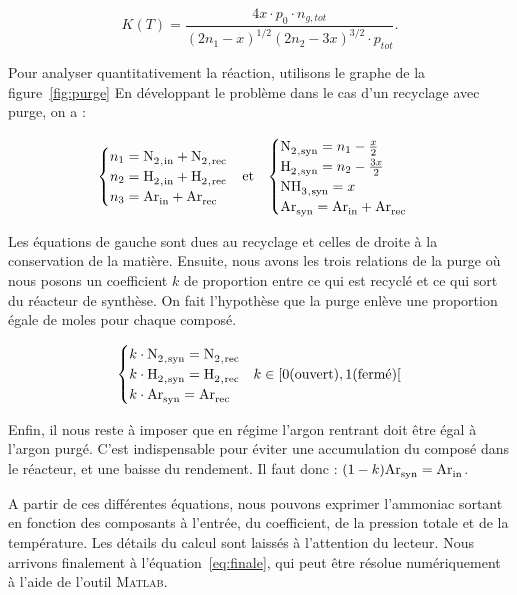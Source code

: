 $$K(T) = \frac{4x\cdot p_0\cdot n_{g,tot}}{(2n_1 - x)^{1/2} (2n_2 - 3x)^{3/2} \cdot p_{tot}}.$$

Pour analyser quantitativement la réaction, utilisons le graphe de la figure~\ref{fig:purge}
En développant le problème dans le cas d'un recyclage avec purge, on a :

\begin{align}
	\notag
	\begin{cases}
	 n_1 = \ce{N2_{,in} + N2_{,rec}} \\
	 n_2 = \ce{H2_{,in} + H2_{,rec}} \\
	 n_3 = \ce{Ar_{in} + Ar_{rec}} \\
	\end{cases}
	 &  \text{et}  &
	\begin{cases}
	 \ce{N2_{,syn}} = n_1 - \frac{x}{2} \\
	 \ce{H2_{,syn}} = n_2 - \frac{3x}{2} \\
	 \ce{NH3_{,syn}} = x \\
	 \ce{Ar_{syn} = Ar_{in} + Ar_{rec}} \\ 
	\end{cases}
	\\
\end{align}

Les équations de gauche sont dues au recyclage et celles de droite 
à la conservation de la matière. Ensuite, nous avons les trois relations
de la purge où nous posons un coefficient $k$ de proportion entre ce qui
est recyclé et ce qui sort du réacteur de synthèse. On fait l'hypothèse
que la purge enlève une proportion égale de moles pour chaque composé.

$$
\begin{cases}
 k\cdot \ce{N2_{,syn}} = \ce{N2_{,rec}} \\ 
 k\cdot \ce{H2_{,syn}} = \ce{H2_{,rec}} & k \in [0 \text{(ouvert)}, 1 \text{(fermé)}[ \\
 k\cdot \ce{Ar_{syn}} = \ce{Ar_{rec}} \\
\end{cases}
$$

Enfin, il nous reste à imposer que en régime l'argon rentrant doit être égal
à l'argon purgé. C'est indispensable pour éviter une accumulation du composé
dans le réacteur, et une baisse du rendement. 
Il faut donc : $(1 - k)\ce{Ar_{syn}} = \ce{Ar_{in}}$.

A partir de ces différentes équations, nous pouvons exprimer l'ammoniac
sortant en fonction des composants à l'entrée, du coefficient, de la pression
totale et de la température. Les détails du calcul sont laissés à l'attention 
du lecteur. Nous arrivons finalement à l'équation~\eqref{eq:finale}, qui peut
être résolue numériquement à l'aide de l'outil \textsc{Matlab}.  


